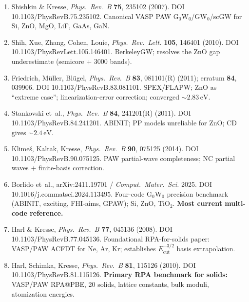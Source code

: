 \documentclass[11pt]{article}
\newcommand{\eV}{\ensuremath{\,\mathrm{eV}}}
\begin{document}
\begin{enumerate}
  \item Shishkin \& Kresse, \emph{Phys.\ Rev.\ B} \textbf{75}, 235102
        (2007). DOI 10.1103/PhysRevB.75.235102. Canonical VASP PAW
        G$_0$W$_0$/GW$_0$/scGW for Si, ZnO, MgO, LiF, GaAs, GaN.

  \item Shih, Xue, Zhang, Cohen, Louie, \emph{Phys.\ Rev.\ Lett.}
        \textbf{105}, 146401 (2010). DOI
        10.1103/PhysRevLett.105.146401. BerkeleyGW; resolves the ZnO
        gap underestimate (semicore + 3000 bands).

  \item Friedrich, M\"{u}ller, Bl\"{u}gel, \emph{Phys.\ Rev.\ B}
        \textbf{83}, 081101(R) (2011); erratum \textbf{84}, 039906.
        DOI 10.1103/PhysRevB.83.081101. SPEX/FLAPW; ZnO as ``extreme
        case''; linearization-error correction; converged $\sim 2.83\eV$.

  \item Stankovski et~al., \emph{Phys.\ Rev.\ B} \textbf{84}, 241201(R)
        (2011). DOI 10.1103/PhysRevB.84.241201. ABINIT; PP models
        unreliable for ZnO; CD gives $\sim 2.4\eV$.

  \item Klime\v{s}, Kaltak, Kresse, \emph{Phys.\ Rev.\ B} \textbf{90},
        075125 (2014). DOI 10.1103/PhysRevB.90.075125. PAW partial-wave
        completeness; NC partial waves + finite-basis correction.

  \item Borlido et~al., arXiv:2411.19701 / \emph{Comput.\ Mater.\ Sci.}
        2025. DOI 10.1016/j.commatsci.2024.113495. Four-code G$_0$W$_0$
        precision benchmark (ABINIT, exciting, FHI-aims, GPAW); Si, ZnO,
        TiO$_2$. \textbf{Most current multi-code reference.}

  \item Harl \& Kresse, \emph{Phys.\ Rev.\ B} \textbf{77}, 045136 (2008).
        DOI 10.1103/PhysRevB.77.045136. Foundational RPA-for-solids
        paper: VASP/PAW ACFDT for Ne, Ar, Kr; establishes
        $E_{\mathrm{cut}}^{-3/2}$ basis extrapolation.

  \item Harl, Schimka, Kresse, \emph{Phys.\ Rev.\ B} \textbf{81},
        115126 (2010). DOI 10.1103/PhysRevB.81.115126.
        \textbf{Primary RPA benchmark for solids:} VASP/PAW RPA@PBE,
        20 solids, lattice constants, bulk moduli, atomization energies.


\end{enumerate}
\end{document}
